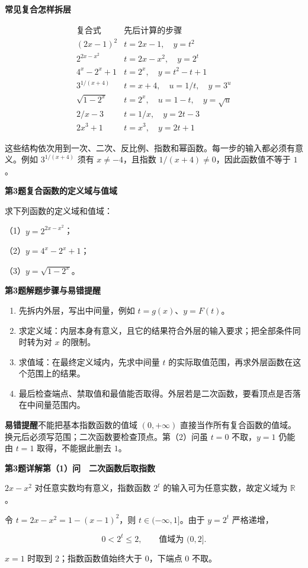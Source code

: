 \documentclass[UTF8,10pt,aspectratio=169]{ctexbeamer}
\newcommand{\PageHeading}[1]{\begin{center}{\Large\bfseries #1}\end{center}\vspace{0.12cm}}
\newcommand{\subq}[1]{\par\vspace{0.15cm}（#1）}
\begin{document}
\begin{frame}[t]
\PageHeading{常见复合怎样拆层}
\[\begin{array}{c|l}\text{复合式}&\text{先后计算的步骤}\\\hline(2x-1)^2&t=2x-1,\quad y=t^2\\2^{2x-x^2}&t=2x-x^2,\quad y=2^t\\4^x-2^x+1&t=2^x,\quad y=t^2-t+1\\3^{1/(x+4)}&t=x+4,\quad u=1/t,\quad y=3^u\\\sqrt{1-2^x}&t=2^x,\quad u=1-t,\quad y=\sqrt u\\2/x-3&t=1/x,\quad y=2t-3\\2x^3+1&t=x^3,\quad y=2t+1\end{array}\]
\par
\pause
这些结构依次用到一次、二次、反比例、指数和幂函数。每一步的输入都必须有意义。例如 $3^{1/(x+4)}$ 须有 $x\ne-4$，且指数 $1/(x+4)\ne0$，因此函数值不等于 $1$。
\par
\end{frame}
\begin{frame}[t]
\PageHeading{第3题\quad 复合函数的定义域与值域}
求下列函数的定义域和值域：
\subq{1}$y=2^{2x-x^2}$；
\subq{2}$y=4^x-2^x+1$；
\subq{3}$y=\sqrt{1-2^x}$。
\par
\end{frame}
\begin{frame}[t]
\PageHeading{第3题\quad 解题步骤与易错提醒}
\begin{enumerate}\item 先拆内外层，写出中间量，例如 $t=g(x)$、$y=F(t)$。
\item 求定义域：内层本身有意义，且它的结果符合外层的输入要求；把全部条件同时转为对 $x$ 的限制。
\item 求值域：在最终定义域内，先求中间量 $t$ 的实际取值范围，再求外层函数在这个范围上的结果。
\item 最后检查端点、禁取值和最值能否取得。外层若是二次函数，要看顶点是否落在中间量范围内。\end{enumerate}
\par
\pause
\vspace{0.18cm}\textbf{易错提醒}\quad 不能把基本指数函数的值域 $(0,+\infty)$ 直接当作所有复合函数的值域。换元后必须写范围；二次函数要检查顶点。第（2）问虽 $t=0$ 不取，$y=1$ 仍能由 $t=1$ 取得，不能据此删去 $1$。
\par
\end{frame}
\begin{frame}[t]
\PageHeading{第3题详解\quad 第（1）问　二次函数后取指数}
$2x-x^2$ 对任意实数均有意义，指数函数 $2^t$ 的输入可为任意实数，故定义域为 $\boxed{\mathbb R}$。
\par
\pause
令 $t=2x-x^2=1-(x-1)^2$，则 $t\in(-\infty,1]$。由于 $y=2^t$ 严格递增，
\par
\[0<2^t\le2,\qquad\boxed{\text{值域为 }(0,2]}.\]
\par
$x=1$ 时取到 $2$；指数函数值始终大于 $0$，下端点 $0$ 不取。
\par
\end{frame}
\end{document}
